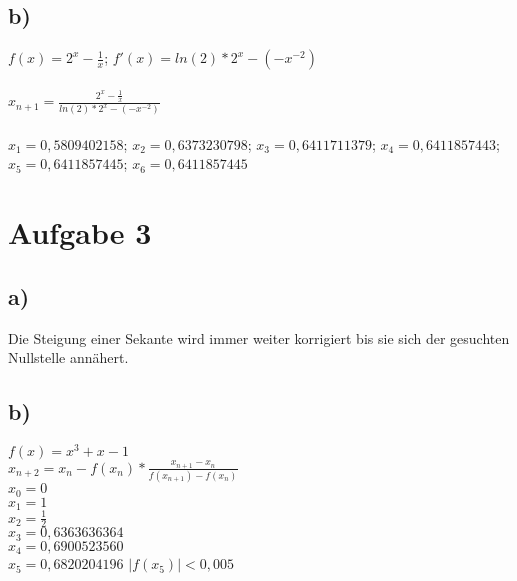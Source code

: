 \documentclass{article}
\begin{document}
	\subsection*{b)}
	$f(x) = 2^x - \frac{1}{x}$; $f'(x) = ln(2)*2^x - (-x^{-2})$ \\ \\
	$x_{n+1} = \frac{ 2^x - \frac{1}{x}}{ln(2)*2^x - (-x^{-2})}$ \\ \\
	$x_1 = 0,5809402158$; $x_2 = 0,6373230798$; $x_3 = 0,6411711379$; $x_4 = 0,6411857443$;$x_5 = 0,6411857445$; $x_6 = 0,6411857445$ 
	\section*{Aufgabe 3}
	\subsection*{a)}
	Die Steigung einer Sekante wird immer weiter korrigiert bis sie sich der gesuchten Nullstelle annähert. 
	\subsection*{b)}
	$f(x) = x^3 + x - 1$ \\
	$x_{n+2} = x_n -f(x_n) * \frac{x_{n+1} - x_n}{f(x_{n+1}) - f(x_n)}$ \\
	$x_0 = 0$ \\
	$x_1 = 1$ \\
	$x_2 = \frac{1}{2}$ \\
	$x_3 = 0,6363636364$ \\
	$x_4 = 0,6900523560$ \\
	$x_5 = 0,6820204196$ $|f(x_5)|<0,005$ \\
\end{document}
